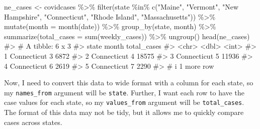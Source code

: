 \documentclass[
  letterpaper,
]{krantz}
\makeatletter
\newenvironment{Shaded}{\begin{snugshade}}{\end{snugshade}}
\newcommand{\AttributeTok}[1]{\textcolor[rgb]{0.40,0.45,0.13}{#1}}
\newcommand{\CommentTok}[1]{\textcolor[rgb]{0.37,0.37,0.37}{#1}}
\newcommand{\FunctionTok}[1]{\textcolor[rgb]{0.28,0.35,0.67}{#1}}
\newcommand{\NormalTok}[1]{\textcolor[rgb]{0.00,0.23,0.31}{#1}}
\newcommand{\OtherTok}[1]{\textcolor[rgb]{0.00,0.23,0.31}{#1}}
\newcommand{\SpecialCharTok}[1]{\textcolor[rgb]{0.37,0.37,0.37}{#1}}
\newcommand{\StringTok}[1]{\textcolor[rgb]{0.13,0.47,0.30}{#1}}
\newenvironment{kframe}{%
\medskip{}
\setlength{\fboxsep}{.8em}
 \def\at@end@of@kframe{}%
 \ifinner\ifhmode%
  \def\at@end@of@kframe{\end{minipage}}%
  \begin{minipage}{\columnwidth}%
 \fi\fi%
 \def\FrameCommand##1{\hskip\@totalleftmargin \hskip-\fboxsep
 \colorbox{shadecolor}{##1}\hskip-\fboxsep
     \hskip-\linewidth \hskip-\@totalleftmargin \hskip\columnwidth}%
 \MakeFramed {\advance\hsize-\width
   \@totalleftmargin\z@ \linewidth\hsize
   \@setminipage}}%
 {\par\unskip\endMakeFramed%
 \at@end@of@kframe}
\renewenvironment{Shaded}{\begin{kframe}}{\end{kframe}}
\makeatother
\begin{document}
\begin{Shaded}
\begin{Highlighting}[]
\NormalTok{ne\_cases }\OtherTok{\textless{}{-}}\NormalTok{ covidcases }\SpecialCharTok{\%\textgreater{}\%} 
  \FunctionTok{filter}\NormalTok{(state }\SpecialCharTok{\%in\%} \FunctionTok{c}\NormalTok{(}\StringTok{"Maine"}\NormalTok{, }\StringTok{"Vermont"}\NormalTok{, }\StringTok{"New Hampshire"}\NormalTok{, }\StringTok{"Connecticut"}\NormalTok{, }
                      \StringTok{"Rhode Island"}\NormalTok{, }\StringTok{"Massachusetts"}\NormalTok{)) }\SpecialCharTok{\%\textgreater{}\%}
  \FunctionTok{mutate}\NormalTok{(}\AttributeTok{month =} \FunctionTok{month}\NormalTok{(date)) }\SpecialCharTok{\%\textgreater{}\%}
  \FunctionTok{group\_by}\NormalTok{(state, month) }\SpecialCharTok{\%\textgreater{}\%}
  \FunctionTok{summarize}\NormalTok{(}\AttributeTok{total\_cases =} \FunctionTok{sum}\NormalTok{(weekly\_cases)) }\SpecialCharTok{\%\textgreater{}\%}
  \FunctionTok{ungroup}\NormalTok{()}
\FunctionTok{head}\NormalTok{(ne\_cases)}
\CommentTok{\#\textgreater{} \# A tibble: 6 x 3}
\CommentTok{\#\textgreater{}   state       month total\_cases}
\CommentTok{\#\textgreater{}   \textless{}chr\textgreater{}       \textless{}dbl\textgreater{}       \textless{}int\textgreater{}}
\CommentTok{\#\textgreater{} 1 Connecticut     3        6872}
\CommentTok{\#\textgreater{} 2 Connecticut     4       18575}
\CommentTok{\#\textgreater{} 3 Connecticut     5       11936}
\CommentTok{\#\textgreater{} 4 Connecticut     6        2619}
\CommentTok{\#\textgreater{} 5 Connecticut     7        2290}
\CommentTok{\#\textgreater{} \# i 1 more row}
\end{Highlighting}
\end{Shaded}

Now, I need to convert this data to wide format with a column for each
state, so my \texttt{names\_from} argument will be \texttt{state}.
Further, I want each row to have the case values for each state, so my
\texttt{values\_from} argument will be \texttt{total\_cases}. The format
of this data may not be tidy, but it allows me to quickly compare cases
across states.
\end{document}
